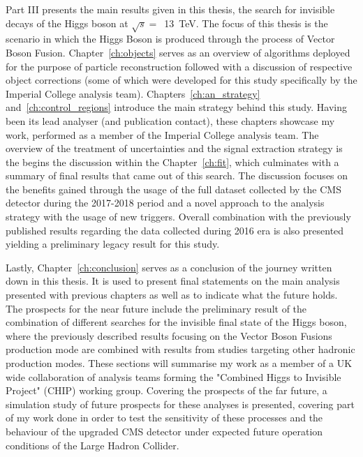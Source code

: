 \hspace{10pt} Part III presents the main results given in this thesis, the search for invisible decays of the Higgs boson at $\sqrt{s}=$~13~TeV. The focus of this thesis is the scenario in which the Higgs Boson is produced through the process of Vector Boson Fusion. Chapter~\ref{ch:objects} serves as an overview of algorithms deployed for the purpose of particle reconstruction followed with a discussion of respective object corrections (some of which were developed for this study specifically by the Imperial College analysis team). Chapters~\ref{ch:an_strategy} and~\ref{ch:control_regions} introduce the main strategy behind this study. Having been its lead analyser (and publication contact), these chapters showcase my work, performed as a member of the Imperial College analysis team. The overview of the treatment of uncertainties and the signal extraction strategy is the begins the discussion within the Chapter~\ref{ch:fit}, which culminates with a summary of final results that came out of this search. The discussion focuses on the benefits gained through the usage of the full dataset collected by the CMS detector during the 2017-2018 period and a novel approach to the analysis strategy with the usage of new triggers. Overall combination with the previously published results regarding the data collected during 2016 era is also presented yielding a preliminary legacy result for this study.

\hspace{10pt} Lastly, Chapter~\ref{ch:conclusion} serves as a conclusion of the journey written down in this thesis. It is used to present final statements on the main analysis presented with previous chapters as well as to indicate what the future holds. The prospects for the near future include the preliminary result of the combination of different searches for the invisible final state of the Higgs boson, where the previously described results focusing on the Vector Boson Fusions production mode are combined with results from studies targeting other hadronic production modes. These sections will summarise my work as a member of a UK wide collaboration of analysis teams forming the "Combined Higgs to Invisible Project" (CHIP) working group. Covering the prospects of the far future, a simulation study of future prospects for these analyses is presented, covering part of my work done in order to test the sensitivity of these processes and the behaviour of the upgraded CMS detector under expected future operation conditions of the Large Hadron Collider.


